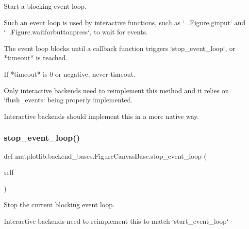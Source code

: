 \begin{DoxyVerb}Start a blocking event loop.

Such an event loop is used by interactive functions, such as
`~.Figure.ginput` and `~.Figure.waitforbuttonpress`, to wait for
events.

The event loop blocks until a callback function triggers
`stop_event_loop`, or *timeout* is reached.

If *timeout* is 0 or negative, never timeout.

Only interactive backends need to reimplement this method and it relies
on `flush_events` being properly implemented.

Interactive backends should implement this in a more native way.
\end{DoxyVerb}
 \mbox{\label{classmatplotlib_1_1backend__bases_1_1FigureCanvasBase_a1136b1dd8e4d7cdf02ce2410d9af67f2}} 
\subsubsection{\texorpdfstring{stop\+\_\+event\+\_\+loop()}{stop\_event\_loop()}}
{\footnotesize\ttfamily def matplotlib.\+backend\+\_\+bases.\+Figure\+Canvas\+Base.\+stop\+\_\+event\+\_\+loop (\begin{DoxyParamCaption}\item[{}]{self }\end{DoxyParamCaption})}

\begin{DoxyVerb}Stop the current blocking event loop.

Interactive backends need to reimplement this to match
`start_event_loop`
\end{DoxyVerb}
 \mbox{\label{classmatplotlib_1_1backend__bases_1_1FigureCanvasBase_ae14767b5eeab37156694190c85b8120f}} 
